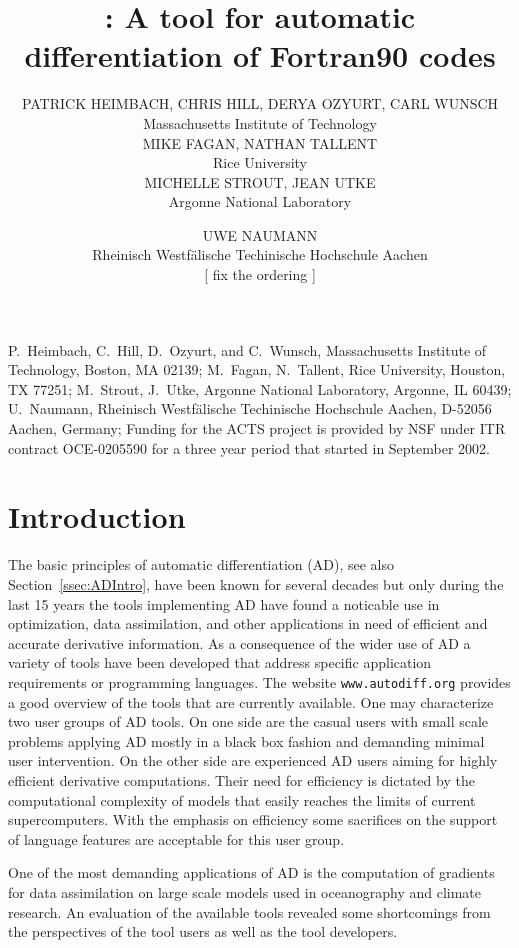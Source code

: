\documentclass[acmtocl,acmnow]{acmtrans2m}
\title{\OpenAD: A tool for automatic differentiation 
of Fortran90 codes}
\author{PATRICK HEIMBACH, CHRIS HILL, DERYA OZYURT, CARL WUNSCH\\Massachusetts Institute of Technology\\
MIKE FAGAN, NATHAN TALLENT \\Rice University\\
MICHELLE STROUT, JEAN UTKE \\Argonne National Laboratory 
\and
UWE NAUMANN\\Rheinisch Westf\"alische Techinische Hochschule Aachen\\
{\color{Red}[ fix the ordering ]}
}
\newcommand{\refsec}[1]{Section~\ref{#1}}
\begin{document}
\begin{bottomstuff} 
P.~Heimbach, C.~Hill, D.~Ozyurt, and C.~Wunsch, Massachusetts Institute of Technology, 
Boston, MA 02139;\newline
M.~Fagan, N.~Tallent, Rice University, 
Houston, TX 77251;\newline
M.~Strout, J.~Utke, Argonne National Laboratory, 
Argonne, IL 60439;\newline
U.~Naumann, Rheinisch Westf\"alische Techinische Hochschule Aachen, 
D-52056 Aachen, Germany;\newline
Funding for the ACTS project is provided by NSF under ITR contract OCE-0205590
for a three year period that started in September 2002.
\end{bottomstuff}
\maketitle

\section{Introduction} \label{sec:Introduction}

The basic principles of automatic differentiation (AD), see also \refsec{ssec:ADIntro}, 
have been known for several decades \cite{wengert}
but only during the last 15 years the tools implementing AD have found a noticable use in 
optimization, data assimilation, and other applications in need of efficient and accurate 
derivative information. 
As a consequence of the wider use of AD 
a variety of tools have been developed that address specific 
application requirements or programming languages. 
The website {\tt www.autodiff.org} provides a good overview of the tools that 
are currently available. 
One may characterize two user groups of AD tools. On one side are the casual users 
with small scale problems applying AD mostly in a black box fashion and demanding 
minimal user intervention. 
On the other side are experienced AD users aiming for highly efficient 
derivative computations. Their need for efficiency is dictated by the 
computational complexity of models that easily reaches the limits of  current 
supercomputers. With the emphasis on efficiency some sacrifices on the support of 
language features are acceptable for this user group. 

One of the most demanding applications of AD is the computation of gradients for 
data assimilation on large scale models used in oceanography and climate research. 
An evaluation of the available tools revealed some shortcomings from the perspectives 
of the tool users as well as the tool developers. 
\end{document}
